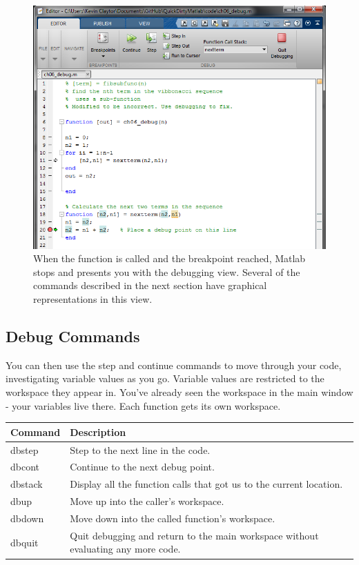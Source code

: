 \pagebreak
\begin{figure}[ht!]
\centering
\includegraphics[width=120mm]{img/debug2.png}
\caption{When the function is called and the breakpoint reached, Matlab stops and presents you with the debugging view. Several of the commands described in the next section have graphical representations in this view.}
\label{guiload}
\end{figure}

\pagebreak
\subsection{Debug Commands}
You can then use the step and continue commands to move through your code, investigating variable values as you go.
 Variable values are restricted to the workspace they appear in.
 You've already seen the workspace in the main window - your variables live there.
 Each function gets its own workspace.

\begin{center}
    \begin{tabular}{ | l | p{7cm} |}
    \hline Command & Description \\ \hline
    dbstep & Step to the next line in the code. \\ \hline
    dbcont & Continue to the next debug point. \\ \hline
    dbstack & Display all the function calls that got us to the current location. \\ \hline
    dbup & Move up into the caller's workspace. \\ \hline
    dbdown & Move down into the called function's workspace. \\ \hline
    dbquit & Quit debugging and return to the main workspace without evaluating any more code. \\ \hline
    \end{tabular}
\end{center}

